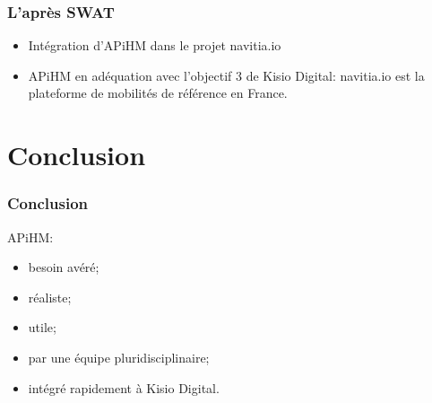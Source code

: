 \documentclass[table]{beamer}
\begin{document}
\begin{frame}
  \frametitle{L'après SWAT}

  \begin{itemize}
  \item Intégration d'APiHM dans le projet navitia.io
  \item APiHM en adéquation avec l'objectif 3 de Kisio Digital:
    navitia.io est la plateforme de mobilités de référence en France.
  \end{itemize}
\end{frame}

\section{Conclusion}

\begin{frame}
  \frametitle{Conclusion}

  APiHM:
  \begin{itemize}
  \item besoin avéré;
  \item réaliste;
  \item utile;
  \item par une équipe pluridisciplinaire;
  \item intégré rapidement à Kisio Digital.
  \end{itemize}
\end{frame}

\begin{frame}
  \titlepage
\end{frame}
\end{document}

